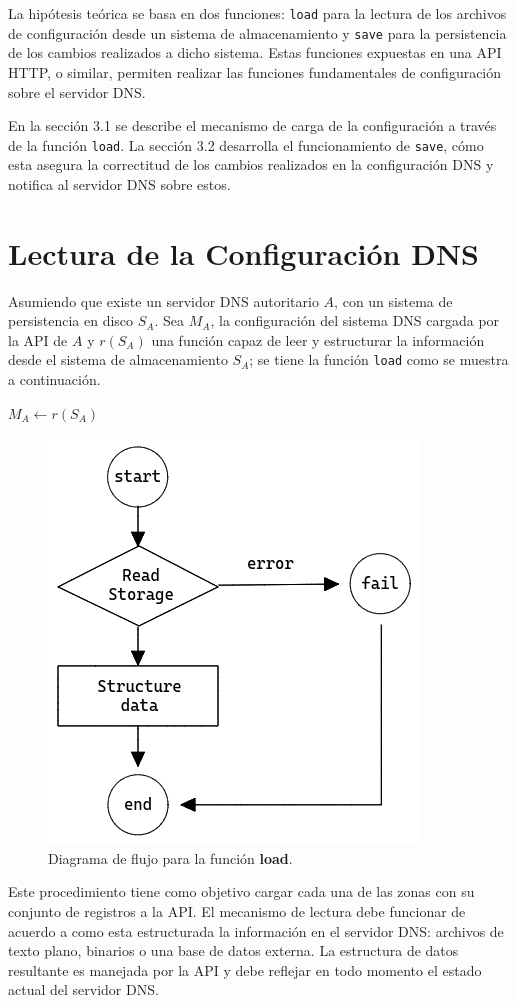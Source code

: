 La hipótesis teórica se basa en dos funciones: \verb+load+ para la lectura de los archivos de configuración desde un sistema de almacenamiento y \verb+save+ para la persistencia de los cambios realizados a dicho sistema. Estas funciones expuestas en una API HTTP, o similar, permiten realizar las funciones fundamentales de configuración sobre el servidor DNS.

En la sección 3.1 se describe el mecanismo de carga de la configuración a través de la función \verb|load|. La sección 3.2 desarrolla el funcionamiento de \verb|save|, cómo esta asegura la correctitud de los cambios realizados en la configuración DNS y notifica al servidor DNS sobre estos.

\section{Lectura de la Configuración DNS}

Asumiendo que existe un servidor DNS autoritario $A$, con un sistema de persistencia en disco $S_A$. Sea $M_A$, la configuración del sistema DNS cargada por la API de $A$ y $r(S_A)$ una función capaz de leer y estructurar la información desde el sistema de almacenamiento $S_A$; se tiene la función \verb+load+ como se muestra a continuación.

\begin{algorithmic}
    \State $M_A \leftarrow r(S_A)$
\EndProcedure
\end{algorithmic}

\begin{figure}[!ht]
    \centering
    \includegraphics[width=0.5\linewidth]{draws/load.png}
    \caption{Diagrama de flujo para la función \textbf{load}.}
\end{figure}

Este procedimiento tiene como objetivo cargar cada una de las zonas con su conjunto de registros a la API. El mecanismo de lectura debe funcionar de acuerdo a como esta estructurada la información en el servidor DNS: archivos de texto plano, binarios o una base de datos externa. La estructura de datos resultante es manejada por la API y debe reflejar en todo momento el estado actual del servidor DNS.

